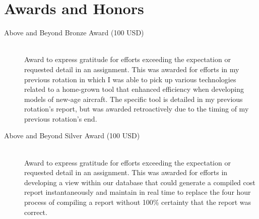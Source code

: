 \documentclass{article}
\begin{document}
\section{Awards and Honors}
\begin{description}
  \item[Above and Beyond Bronze Award (100 USD)] \hfill \\
    Award to express gratitude for efforts exceeding the expectation or requested detail in an assignment. This was awarded for efforts in my previous rotation in which I was able to pick up various technologies related to a home-grown tool that enhanced efficiency when developing models of new-age aircraft. The specific tool is detailed in my previous rotation's report, but was awarded retroactively due to the timing of my previous rotation's end.
  \item[Above and Beyond Silver Award (100 USD)] \hfill \\
    Award to express gratitude for efforts exceeding the expectation or requested detail in an assignment. This was awarded for efforts in developing a view within our database that could generate a compiled cost report instantaneously and maintain in real time to replace the four hour process of compiling a report without 100\% certainty that the report was correct.
\end{description}
\end{document}
